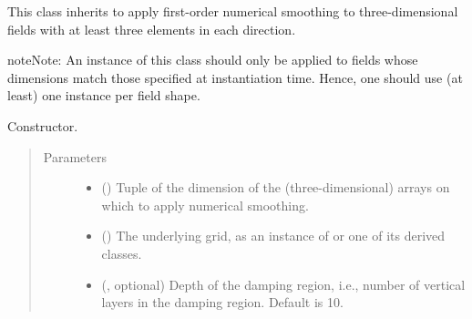 \documentclass[letterpaper,10pt,english]{sphinxmanual}
\begin{document}
\begin{fulllineitems}
\label{\detokenize{api:tasmania.dycore.horizontal_smoothing.HorizontalSmoothingFirstOrderXYZ}}
This class inherits {\hyperref[\detokenize{api:tasmania.dycore.horizontal_smoothing.HorizontalSmoothing}]{}} to apply first-order
numerical smoothing to three-dimensional fields with at least three elements in each direction.

\begin{sphinxadmonition}{note}{Note:}
An instance of this class should only be applied to fields whose dimensions match those specified at instantiation time.
Hence, one should use (at least) one instance per field shape.
\end{sphinxadmonition}

\begin{fulllineitems}
\label{\detokenize{api:tasmania.dycore.horizontal_smoothing.HorizontalSmoothingFirstOrderXYZ.__init__}}
Constructor.
\begin{quote}\begin{description}
\item[{Parameters}] \leavevmode\begin{itemize}
\item {} 
 () \textendash{} Tuple of the dimension of the (three-dimensional) arrays on which to apply numerical smoothing.

\item {} 
 () \textendash{} The underlying grid, as an instance of {\hyperref[\detokenize{api:tasmania.grids.grid_xyz.GridXYZ}]{}} or one of its derived classes.

\item {} 
 (, optional) \textendash{} Depth of the damping region, i.e., number of vertical layers in the damping region. Default is 10.


\end{itemize}
\end{description}
\end{quote}
\end{fulllineitems}
\end{fulllineitems}
\end{document}
